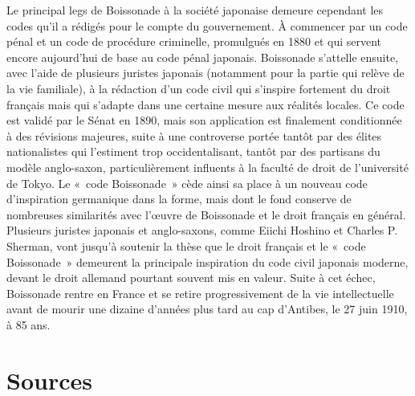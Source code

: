 \documentclass[11pt,a4paper]{article}
\begin{document}
Le principal legs de Boissonade à la société japonaise demeure cependant les codes qu'il a rédigés pour le compte du gouvernement. À commencer par un code pénal et un code de procédure criminelle, promulgués en 1880 et qui servent encore aujourd'hui de base au code pénal japonais. Boissonade s'attelle ensuite, avec l'aide de plusieurs juristes japonais (notamment pour la partie qui relève de la vie familiale), à la rédaction d'un code civil qui s'inspire fortement du droit français mais qui s'adapte dans une certaine mesure aux réalités locales. Ce code est validé par le Sénat en 1890, mais son application est finalement conditionnée à des révisions majeures, suite à une controverse portée tantôt par des élites nationalistes qui l'estiment trop occidentalisant, tantôt par des partisans du modèle anglo-saxon, particulièrement influents à la faculté de droit de l'université de Tokyo. Le «~code Boissonade~» cède ainsi sa place à un nouveau code d'inspiration germanique dans la forme, mais dont le fond conserve de nombreuses similarités avec l'œuvre de Boissonade et le droit français en général. Plusieurs juristes japonais et anglo-saxons, comme Eiichi Hoshino et Charles P. Sherman, vont jusqu'à soutenir la thèse que le droit français et le «~code Boissonade~» demeurent la principale inspiration du code civil japonais moderne, devant le droit allemand pourtant souvent mis en valeur. Suite à cet échec, Boissonade rentre en France et se retire progressivement de la vie intellectuelle avant de mourir une dizaine d'années plus tard au cap d'Antibes, le 27 juin 1910, à 85 ans.

\section{Sources}
\small
\end{document}
